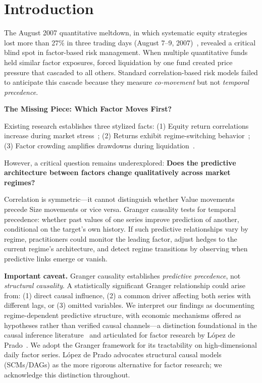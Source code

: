 \documentclass[sigconf,anonymous]{acmart}
\begin{document}
\maketitle

\section{Introduction}

The August 2007 quantitative meltdown, in which systematic equity strategies lost
more than 27\% in three trading days (August 7--9, 2007)~\cite{khandani2011quants}, revealed a critical
blind spot in factor-based risk management.
When multiple quantitative funds held similar factor exposures, forced liquidation
by one fund created price pressure that cascaded to all others.
Standard correlation-based risk models failed to anticipate this cascade because they
measure \emph{co-movement} but not \emph{temporal precedence}.

\textbf{The Missing Piece: Which Factor Moves First?}

Existing research establishes three stylized facts:
(1) Equity return correlations increase during market stress~\cite{ang2002asymmetric};
(2) Returns exhibit regime-switching behavior~\cite{hamilton1989new};
(3) Factor crowding amplifies drawdowns during liquidation~\cite{stein2009presidential}.

However, a critical question remains underexplored: \textbf{Does the predictive
architecture between factors change qualitatively across market regimes?}

Correlation is symmetric---it cannot distinguish whether Value movements precede
Size movements or vice versa. Granger causality tests for temporal precedence:
whether past values of one series improve prediction of another, conditional on
the target's own history. If such predictive relationships vary by regime, practitioners could
monitor the leading factor, adjust hedges to the current regime's architecture,
and detect regime transitions by observing when predictive links emerge or vanish.

\textbf{Important caveat.} Granger causality establishes \emph{predictive precedence},
not \emph{structural causality}. A statistically significant Granger relationship
could arise from: (1) direct causal influence, (2) a common driver affecting both
series with different lags, or (3) omitted variables. We interpret our findings as documenting regime-dependent predictive structure,
with economic mechanisms offered as hypotheses rather than verified causal channels---a
distinction foundational in the causal inference literature~\cite{pearl2009causality}
and articulated for factor research by L\'opez de Prado~\cite{lopezdeprado2023causal}.
We adopt the Granger framework for its tractability on high-dimensional daily
factor series. L\'opez de Prado advocates structural causal models (SCMs/DAGs)
as the more rigorous alternative for factor research; we acknowledge this
distinction throughout.
\end{document}

